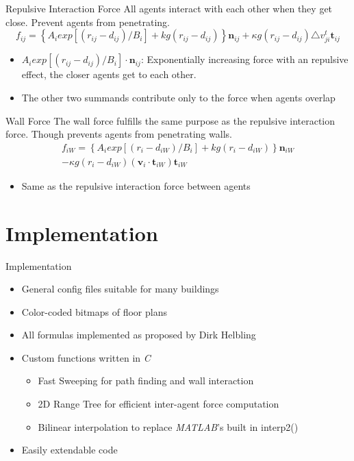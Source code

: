 \begin{frame}{Repulsive Interaction Force}
All agents interact with each other when they get close. Prevent agents from penetrating.
\begin{equation*}
f_{ij}=\left\{A_{i}exp[(r_{ij}-d_{ij})/B_{i}]+kg(r_{ij}-d_{ij})\right\}\mathbf{n}_{ij}+\kappa g(r_{ij}-d_{ij})\triangle v_{ji}^t\mathbf{t}_{ij}
\end{equation*}
\begin{itemize}
\item $A_{i}exp[(r_{ij}-d_{ij})/B_{i}]\cdot\mathbf{n}_{ij}$: Exponentially increasing force with an repulsive effect, the closer agents get to each other.
\item The other two summands contribute only to the force when agents overlap
\end{itemize}
\end{frame}

\begin{frame}{Wall Force}
The wall force fulfills the same purpose as the repulsive interaction force. Though prevents agents from penetrating walls.
\begin{multline*}
f_{iW}=\left\{A_{i}exp[(r_{i}-d_{iW})/B_{i}]+kg(r_{i}-d_{iW})\right\}\mathbf{n}_{iW}\\-\kappa g(r_{i}-d_{iW})(\mathbf{v}_{i}\cdot\mathbf{t}_{iW})\mathbf{t}_{iW}
\end{multline*}
\begin{itemize}
\item Same as the repulsive interaction force between agents
\end{itemize}
\end{frame}

\section{Implementation}

\begin{frame}{Implementation}
\begin{itemize}
 \item General config files suitable for many buildings
 \item Color-coded bitmaps of floor plans
 \item All formulas implemented as proposed by Dirk Helbling
 \item Custom functions written in \textit{C}
 \begin{itemize}
  \item Fast Sweeping for path finding and wall interaction
  \item 2D Range Tree for efficient inter-agent force computation
  \item Bilinear interpolation to replace \textit{MATLAB}'s built in interp2()
 \end{itemize}
 \item Easily extendable code
\end{itemize}
\end{frame}


